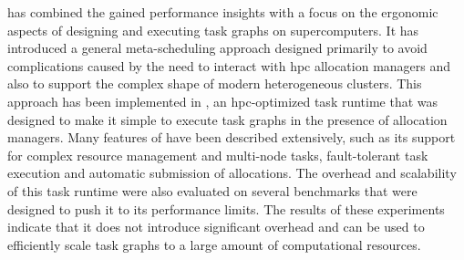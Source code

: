  has combined the gained performance insights with a focus on
the ergonomic aspects of designing and executing task graphs on supercomputers. It has introduced
a general meta-scheduling approach designed primarily to avoid complications caused by the need to
interact with \gls{hpc} allocation managers and also to support the complex shape
of modern heterogeneous clusters. This approach has been implemented in \hyperqueue{},
an \gls{hpc}-optimized task runtime that was designed to make it simple to execute
task graphs in the presence of allocation managers. Many features of \hyperqueue{}
have been described extensively, such as its support for complex resource management and multi-node
tasks, fault-tolerant task execution and automatic submission of allocations. The overhead and
scalability of this task runtime were also evaluated on several benchmarks that were designed to
push it to its performance limits. The results of these experiments indicate that it does not
introduce significant overhead and can be used to efficiently scale task graphs to a large amount
of computational resources.

